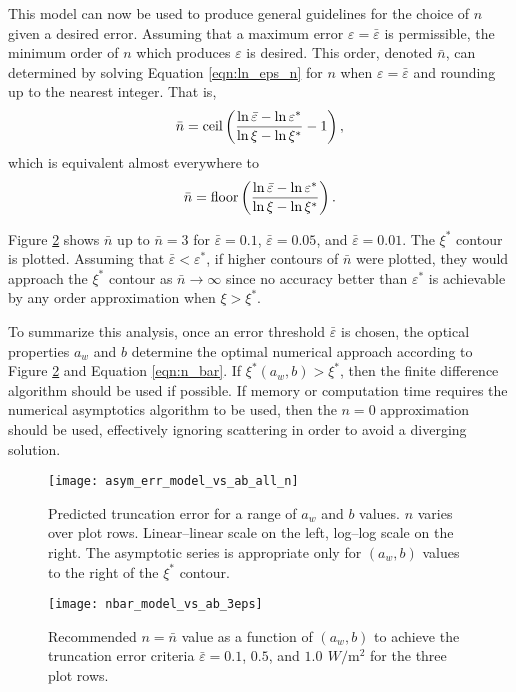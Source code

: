 This model can now be used to produce general guidelines for the choice of $n$ given a desired error.
Assuming that a maximum error $\varepsilon=\bar\varepsilon$ is permissible, the minimum order of $n$ which produces $\varepsilon$ is desired.
This order, denoted $\bar{n}$, can determined by solving Equation \eqref{eqn:ln_eps_n} for $n$ when $\varepsilon=\bar{\varepsilon}$ and rounding up to the nearest integer.
That is,
\begin{equation*}
  \bar{n} = \mbox{ceil}\left(\frac{\ln\bar{\varepsilon} - \ln\varepsilon^*}{\ln\xi - \ln\xi^*} - 1 \right),
\end{equation*}
which is equivalent almost everywhere to
\begin{equation}
  \label{eqn:n_bar}
  \bar{n} = \mbox{floor}\left(\frac{\ln\bar{\varepsilon} - \ln\varepsilon^*}{\ln\xi - \ln\xi^*}\right).
\end{equation}


Figure \ref{fig:nbar_model_vs_ab_3eps} shows $\bar{n}$ up to $\bar{n}=3$ for $\bar{\varepsilon}=0.1$, $\bar{\varepsilon}=0.05$, and $\bar{\varepsilon}=0.01$.
The $\xi^*$ contour is plotted.
Assuming that $\bar{\varepsilon}<\varepsilon^*$, if higher contours of $\bar{n}$ were plotted, they would approach the $\xi^*$ contour as $\bar{n} \to \infty$ since no accuracy better than $\varepsilon^*$ is achievable by any order approximation when $\xi > \xi^*$.

To summarize this analysis, once an error threshold $\bar{\varepsilon}$ is chosen, the optical properties $a_w$ and $b$ determine the optimal numerical approach according to Figure \ref{fig:nbar_model_vs_ab_3eps} and Equation \eqref{eqn:n_bar}.
If $\xi^*(a_w, b) > \xi^*$, then the finite difference algorithm should be used if possible.
If memory or computation time requires the numerical asymptotics algorithm to be used, then the $n=0$ approximation should be used, effectively ignoring scattering in order to avoid a diverging solution.

\begin{figure}[H]
  \centering
  \texttt{[image: asym\_err\_model\_vs\_ab\_all\_n]}
  \caption{Predicted truncation error for a range of $a_w$ and $b$ values. $n$ varies over plot rows. Linear--linear scale on the left, log--log scale on the right. The asymptotic series is appropriate only for $(a_w,b)$ values to the right of the $\xi^*$ contour.}
  \label{fig:asym_err_model_vs_ab_all_n}
\end{figure}

\begin{figure}[H]
  \centering
  \texttt{[image: nbar\_model\_vs\_ab\_3eps]}
  \caption{Recommended $n=\bar{n}$ value as a function of $(a_w,b)$ to achieve the truncation error criteria $\bar{\varepsilon}=0.1$, $0.5$, and $1.0\,\SI{}{W\per\m\squared}$ for the three plot rows.}
  \label{fig:nbar_model_vs_ab_3eps}
\end{figure}

